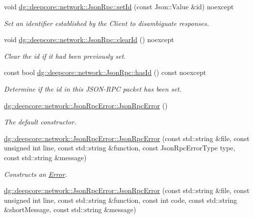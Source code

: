 \begin{DoxyCompactItemize}
void \hyperlink{group___network_module_gaf71b65c7bb55adbf936c38ffd1cd8289}{dg\+::deepcore\+::network\+::\+Json\+Rpc\+::set\+Id} (const Json\+::\+Value \&id) noexcept
\begin{DoxyCompactList}\small\item\em Set an identifier established by the Client to disambiguate responses. \end{DoxyCompactList}\item 
void \hyperlink{group___network_module_gaa92eeabe2c022b96d2820a02118dc1b2}{dg\+::deepcore\+::network\+::\+Json\+Rpc\+::clear\+Id} () noexcept
\begin{DoxyCompactList}\small\item\em Clear the id if it had been previously set. \end{DoxyCompactList}\item 
const bool \hyperlink{group___network_module_gaef8ff7e1ae84dc613d31615fa973a521}{dg\+::deepcore\+::network\+::\+Json\+Rpc\+::has\+Id} () const noexcept
\begin{DoxyCompactList}\small\item\em Determine if the id in this J\+S\+O\+N-\/\+R\+PC packet has been set. \end{DoxyCompactList}\item 
\hyperlink{group___network_module_ga6177a0628073de16562fdbaf8ef12f33}{dg\+::deepcore\+::network\+::\+Json\+Rpc\+Error\+::\+Json\+Rpc\+Error} ()
\begin{DoxyCompactList}\small\item\em The default constructor. \end{DoxyCompactList}\item 
\hyperlink{group___network_module_ga041044a45186dbc1faa970ec45ecba81}{dg\+::deepcore\+::network\+::\+Json\+Rpc\+Error\+::\+Json\+Rpc\+Error} (const std\+::string \&file, const unsigned int line, const std\+::string \&function, const Json\+Rpc\+Error\+Type type, const std\+::string \&message)
\begin{DoxyCompactList}\small\item\em Constructs an \hyperlink{classdg_1_1deepcore_1_1_error}{Error}. \end{DoxyCompactList}\item 
\hyperlink{group___network_module_gad7b1e6630b2774ffa45cbcc88b9a1b3f}{dg\+::deepcore\+::network\+::\+Json\+Rpc\+Error\+::\+Json\+Rpc\+Error} (const std\+::string \&file, const unsigned int line, const std\+::string \&function, const int code, const std\+::string \&short\+Message, const std\+::string \&message)

\end{DoxyCompactItemize}
